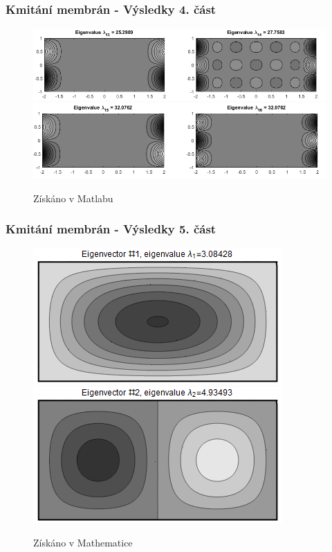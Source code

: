 \documentclass[xcolor=table]{beamer}
\begin{document}
\begin{frame}
\frametitle{Kmitání membrán - Výsledky 4. část}
\centering
\begin{figure}
\includegraphics[width=1\linewidth]{obdelnicky7.png}
\includegraphics[width=1\linewidth]{obdelnicky8.png}
\caption{Získáno v Matlabu}
\end{figure}
\end{frame}

\begin{frame}
\frametitle{Kmitání membrán - Výsledky 5. část}
\centering
\begin{figure}
\includegraphics[width=.6\linewidth]{rectangle-eigenvector-1.png}
\includegraphics[width=.6\linewidth]{rectangle-eigenvector-2.png}
\caption{Získáno v Mathematice}
\end{figure}
\end{frame}
\end{document}
